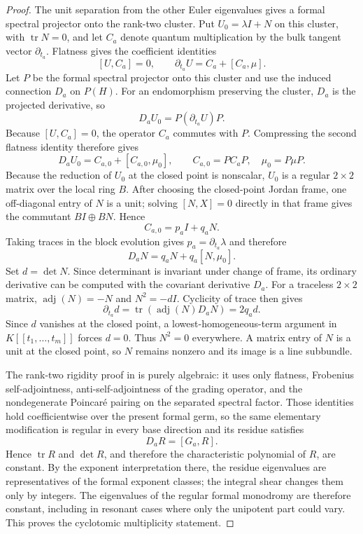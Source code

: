 \begin{proof}
The unit separation from the other Euler eigenvalues gives a formal spectral
projector onto the rank-two cluster.  Put
$U_0=\lambda I+N$ on this cluster, with $\operatorname{tr}N=0$, and let
$C_a$ denote quantum multiplication by the bulk tangent vector
$\partial_{t_a}$.  Flatness gives the coefficient identities
\[
 [U,C_a]=0,\qquad
 \partial_{t_a}U=C_a+[C_a,\mu].
\]
Let $P$ be the formal spectral projector onto this cluster and use the
induced connection $D_a$ on $P(H)$.  For an endomorphism preserving the
cluster, $D_a$ is the projected derivative, so
\[
 D_aU_0=P(\partial_{t_a}U)P.
\]
Because $[U,C_a]=0$, the operator $C_a$ commutes with $P$.  Compressing the
second flatness identity therefore gives
\[
 D_aU_0=C_{a,0}+[C_{a,0},\mu_0],
 \qquad C_{a,0}=PC_aP,\quad \mu_0=P\mu P.
\]
Because the reduction of $U_0$ at the closed point is nonscalar, $U_0$ is a
regular $2\times2$ matrix over the local ring $B$.  After choosing the
closed-point Jordan frame, one off-diagonal entry of $N$ is a unit; solving
$[N,X]=0$ directly in that frame gives the commutant $B I\oplus B N$.
Hence
\[
 C_{a,0}=p_aI+q_aN.
\]
Taking traces in the block evolution gives $p_a=\partial_{t_a}\lambda$ and
therefore
\[
 D_aN=q_aN+q_a[N,\mu_0].
\]
Set $d=\det N$.  Since determinant is invariant under change of frame,
its ordinary derivative can be computed with the covariant derivative
$D_a$.  For a traceless $2\times2$ matrix,
$\operatorname{adj}(N)=-N$ and $N^2=-dI$.  Cyclicity of trace then gives
\[
 \partial_{t_a}d
 =\operatorname{tr}(\operatorname{adj}(N)D_aN)
 =2q_a d.
\]
Since $d$ vanishes at the closed point, a lowest-homogeneous-term argument
in $K[[t_1,\ldots,t_m]]$ forces $d=0$.  Thus $N^2=0$ everywhere.  A matrix
entry of $N$ is a unit at the closed point, so $N$ remains nonzero and its
image is a line subbundle.

The rank-two rigidity proof in \cite[Section~2]{RuddM1} is purely algebraic: it
uses only flatness, Frobenius self-adjointness, anti-self-adjointness of the
grading operator, and the nondegenerate Poincar\'e pairing on the separated
spectral factor.  Those identities hold coefficientwise over the present
formal germ, so the same elementary modification is regular in every base
direction and its residue satisfies
\[
 D_aR=[G_a,R].
\]
Hence $\operatorname{tr}R$ and $\det R$, and therefore the characteristic
polynomial of $R$, are constant.  By
the exponent interpretation there, the residue
eigenvalues are representatives of the formal exponent classes; the
integral shear changes them only by integers.  The eigenvalues of the
regular formal monodromy are therefore constant, including in resonant
cases where only the unipotent part could vary.  This proves the cyclotomic
multiplicity statement.
\end{proof}

